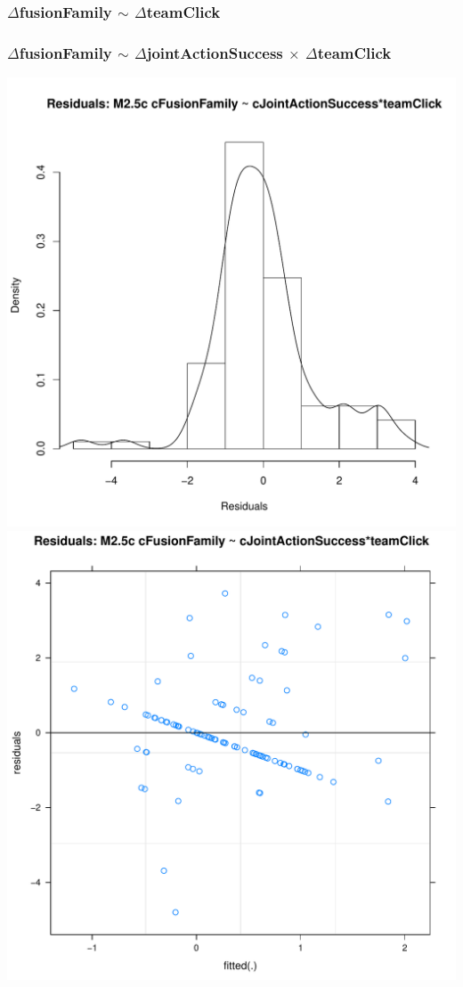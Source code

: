 \documentclass[12pt]{report}
\begin{document}
\subsubsection{$\Delta$fusionFamily $\sim$ $\Delta$teamClick}



\newpage
\subsubsection{$\Delta$fusionFamily $\sim$  $\Delta$jointActionSuccess $\times$ $\Delta$teamClick}

\newpage
\centering
\includegraphics[scale =.4]{../images/MLM25cHist.pdf}
\includegraphics[scale =.4]{../images/MLM25cScatter.pdf}
\end{document}
